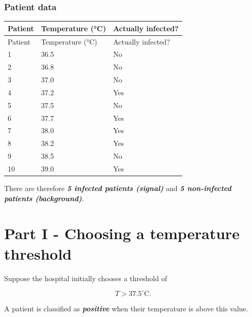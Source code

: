\documentclass{course_sheet}
\begin{document}
\subsubsection*{Patient data}
\begingroup
\small
\setlength{\tabcolsep}{4pt}
\begin{longtable}{l|l|l}
Patient & Temperature (°C) & Actually infected? \\[1.5pt]
\hline
\endfirsthead
Patient & Temperature (°C) & Actually infected? \\[1.5pt]
\hline
\endhead
1 & 36.5 & No \\[1.5pt]
2 & 36.8 & No \\[1.5pt]
3 & 37.0 & No \\[1.5pt]
4 & 37.2 & Yes \\[1.5pt]
5 & 37.5 & No \\[1.5pt]
6 & 37.7 & Yes \\[1.5pt]
7 & 38.0 & Yes \\[1.5pt]
8 & 38.2 & Yes \\[1.5pt]
9 & 38.5 & No \\[1.5pt]
10 & 39.0 & Yes \\[1.5pt]
\end{longtable}
\endgroup
There are therefore \textbf{\textit{5 infected patients (signal)}} and \textbf{\textit{5 non-infected patients (background)}}.

\clearpage
\section*{Part I - Choosing a temperature threshold}
Suppose the hospital initially chooses a threshold of

\[
T > 37.5^\circ\mathrm{C}.
\]

A patient is classified as \textbf{\textit{positive}} when their temperature is above this value.
\end{document}

